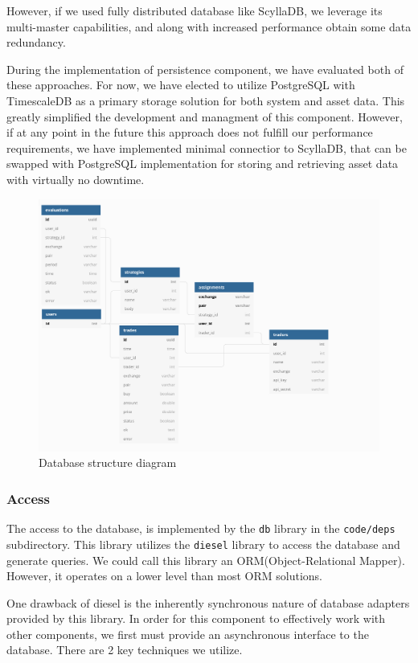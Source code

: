 However, if we used fully distributed database like ScyllaDB, we leverage its multi-master capabilities, and
along with increased performance obtain some data redundancy.

During the implementation of persistence component, we have evaluated both of these approaches. For now,
we have elected to utilize PostgreSQL with TimescaleDB as a primary storage solution for both system and asset data.
This greatly simplified the development and managment of this component. However, if at any point in the future
this approach does not fulfill our performance requirements, we have implemented minimal connectior to ScyllaDB, that
can be swapped with PostgreSQL implementation for storing and retrieving asset data with virtually no downtime.


\begin{figure}[H]
    \includegraphics[width=\textwidth]{obrazky-figures/db_diag.png}
    \caption{Database structure diagram}
    \label{img:arch}
\end{figure}


\subsubsection{Access}
The access to the database, is implemented by the \verb|db| library in the \verb|code/deps| subdirectory.
This library utilizes the \verb|diesel| library
to access the database and generate queries. We could call this library an ORM(Object-Relational Mapper).
However, it operates on a lower level than most ORM solutions.

One drawback of diesel is the inherently synchronous nature of database adapters provided by this library.
In order for this component to effectively work with other components, we first must provide an asynchronous interface
to the database. There are 2 key techniques we utilize.

